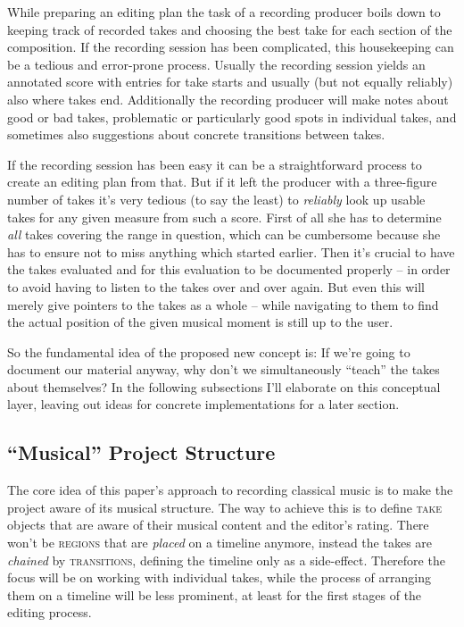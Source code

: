 \documentclass[11pt,a4paper]{article}
\newcommand*{\term}[1]{\textsc{#1}}
\begin{document}
While preparing an editing plan the task of a recording producer boils down to
keeping track of recorded takes and choosing the best take for each section of
the composition.
If the recording session has been complicated, this housekeeping can be a
tedious and error-prone process.
Usually the recording session yields an annotated score with entries for take
starts and usually (but not equally reliably) also where takes end.
Additionally the recording producer will make notes about good or bad takes,
problematic or particularly good spots in individual takes, and sometimes also
suggestions about concrete transitions between takes.

If the recording session has been easy it can be a straightforward process to
create an editing plan from that.
But if it left the producer with a three-figure number of takes it's very
tedious (to say the least) to \emph{reliably} look up usable takes for any given
measure from such a score.
First of all she has to determine \emph{all} takes covering the range in
question, which can be cumbersome because she has to ensure not to miss anything
which started earlier.
Then it's crucial to have the takes evaluated and for this evaluation to be
documented properly -- in order to avoid having to listen to the takes over and
over again.
But even this will merely give pointers to the takes as a whole -- while
navigating to them to find the actual position of the given musical moment is
still up to the user.

So the fundamental idea of the proposed new concept is:
If we're going to document our material anyway, why don't we simultaneously
“teach” the takes about themselves?
In the following subsections I'll elaborate on this conceptual layer, leaving out
ideas for concrete implementations for a later section.

\subsection{“Musical” Project Structure}

The core idea of this paper's approach to recording classical music is to make
the project aware of its musical structure. The way to achieve this is to define
\term{take} objects that are aware of their musical content and the editor's rating.
There won't be \term{regions} that are \emph{placed} on a timeline anymore, instead
the takes are \emph{chained} by \term{transitions}, defining the timeline only as a side-effect.
Therefore the focus will be on working with individual takes, while the process of
arranging them on a timeline will be less prominent, at least for the first stages
of the editing process. 
\end{document}
